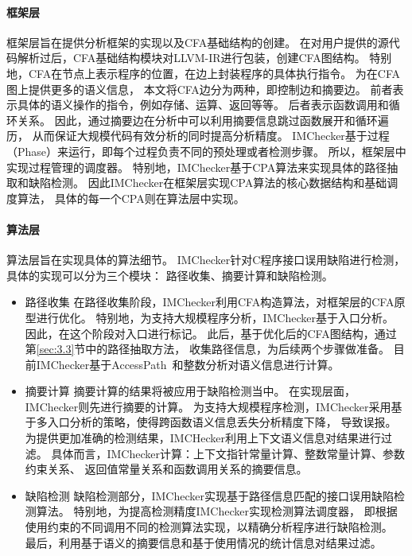 \paragraph{框架层}
框架层旨在提供分析框架的实现以及CFA基础结构的创建。
在对用户提供的源代码解析过后，CFA基础结构模块对LLVM-IR进行包装，创建CFA图结构。
特别地，CFA在节点上表示程序的位置，在边上封装程序的具体执行指令。
为在CFA图上提供更多的语义信息，
本文将CFA边分为两种，即控制边和摘要边。
前者表示具体的语义操作的指令，例如存储、运算、返回等等。
后者表示函数调用和循环关系。
因此，通过摘要边在分析中可以利用摘要信息跳过函数展开和循环遍历，
从而保证大规模代码有效分析的同时提高分析精度。
IMChecker基于过程（Phase）来运行，即每个过程负责不同的预处理或者检测步骤。
所以，框架层中实现过程管理的调度器。
特别地，IMChecker基于CPA算法来实现具体的路径抽取和缺陷检测。
因此IMChecker在框架层实现CPA算法的核心数据结构和基础调度算法，
具体的每一个CPA则在算法层中实现。

\paragraph{算法层}
算法层旨在实现具体的算法细节。
IMChecker针对C程序接口误用缺陷进行检测，具体的实现可以分为三个模块：
路径收集、摘要计算和缺陷检测。
\begin{itemize}
	\item {\kaishu 路径收集} 
	在路径收集阶段，IMChecker利用CFA构造算法，对框架层的CFA原型进行优化。
	特别地，为支持大规模程序分析，IMChecker基于入口分析。
	因此，在这个阶段对入口进行标记。
	此后，基于优化后的CFA图结构，通过第\ref{sec:3.3}节中的路径抽取方法，
	收集路径信息，为后续两个步骤做准备。
	目前IMChecker基于AccessPath~\cite{15-ase-accesspath}和整数分析对语义信息进行计算。
	\item {\kaishu 摘要计算} 
	摘要计算的结果将被应用于缺陷检测当中。
	在实现层面，IMChecker则先进行摘要的计算。
	为支持大规模程序检测，IMChecker采用基于多入口分析的策略，使得跨函数语义信息丢失分析精度下降，
	导致误报。
	为提供更加准确的检测结果，IMCHecker利用上下文语义信息对结果进行过滤。
	具体而言，IMChecker计算：上下文指针常量计算、整数常量计算、参数约束关系、
	返回值常量关系和函数调用关系的摘要信息。
	\item {\kaishu 缺陷检测} 
	缺陷检测部分，IMChecker实现基于路径信息匹配的接口误用缺陷检测算法。
	特别地，为提高检测精度IMChecker实现检测算法调度器，
	即根据使用约束的不同调用不同的检测算法实现，以精确分析程序进行缺陷检测。
	最后，利用基于语义的摘要信息和基于使用情况的统计信息对结果过滤。
\end{itemize}


